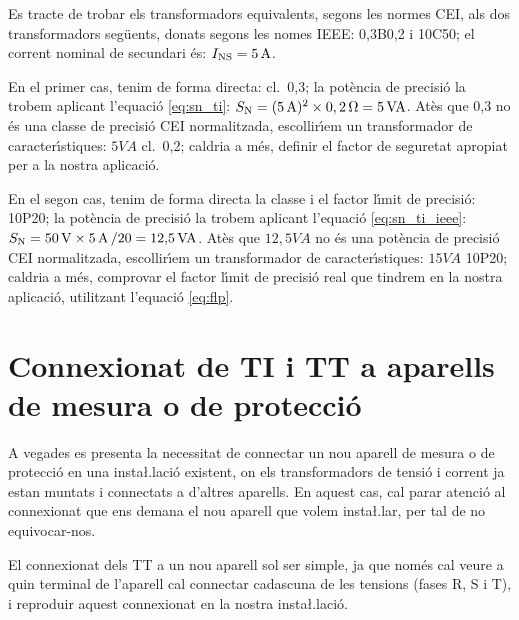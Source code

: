 \begin{exemple}
    Es tracte de trobar els transformadors equivalents, segons les normes \textsf{CEI}, als dos
    transformadors seg\"{u}ents, donats segons les nomes \textsf{IEEE}: 0,3B0,2 i
    10C50; el corrent nominal de secundari \'{e}s:    $I_\mathrm{NS}=5\mathrm{\,A}$.

    En el primer cas, tenim de forma directa: cl.~0,3; la pot\`{e}ncia de precisi\'{o} la trobem
    aplicant l'equaci\'{o} \eqref{eq:sn_ti}: $S_\mathrm{N} =(5\mathrm{\,A})^2 \times 0,2\mathrm{\,\mathrm{\Omega}} =
    5\mathrm{\,VA}$.
    At\`{e}s que 0,3 no \'{e}s una classe de precisi\'{o} \textsf{CEI} normalitzada,
    escollir\'{\i}em un transformador de caracter\'{\i}stiques:
    $5\unit{VA}$ cl.~0,2; caldria a m\'{e}s, definir el factor de
    seguretat apropiat per a la nostra aplicaci\'{o}.

    En el segon cas, tenim de forma directa la classe i el factor l\'{\i}mit de
    precisi\'{o}: 10P20; la pot\`{e}ncia de precisi\'{o} la trobem
    aplicant l'equaci\'{o} \eqref{eq:sn_ti_ieee}: $S_\mathrm{N} = 50\mathrm{\,V} \times
    5\mathrm{\,A}\, / 20 = 12{,}5\mathrm{\,VA}$.
    At\`{e}s que $12{,}5\unit{VA}$ no \'{e}s una pot\`{e}ncia de precisi\'{o} \textsf{CEI} normalitzada,
     escollir\'{\i}em un transformador de caracter\'{\i}stiques:
    $15\unit{VA}$ 10P20; caldria a m\'{e}s, comprovar el factor l\'{\i}mit de precisi\'{o} real
    que tindrem en la nostra aplicaci\'{o}, utilitzant l'equaci\'{o} \eqref{eq:flp}.

\end{exemple}

\section{Connexionat de TI i TT a aparells de mesura o de
protecci\'{o}}\label{sec:conex_ti_tt}

A vegades es presenta la necessitat de connectar un nou aparell de
mesura o de protecci\'{o} en una insta{\l.l}aci\'{o} existent, on els
transformadors de tensi\'{o} i corrent ja estan muntats i connectats a
d'altres aparells. En aquest cas, cal parar atenci\'{o} al connexionat
que ens demana el nou aparell que volem insta{\l.l}ar, per tal de no
equivocar-nos.

El connexionat dels TT a un nou aparell sol ser simple, ja que nom\'{e}s
cal veure a quin terminal de l'aparell cal connectar cadascuna de
les tensions (fases R, S i T), i reproduir aquest connexionat en la
nostra insta{\l.l}aci\'{o}.

